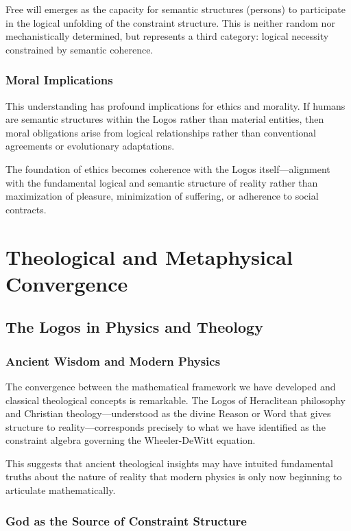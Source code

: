 \documentclass[12pt,a4paper]{article}
\begin{document}
Free will emerges as the capacity for semantic structures (persons) to participate in the logical unfolding of the constraint structure. This is neither random nor mechanistically determined, but represents a third category: logical necessity constrained by semantic coherence.

\subsubsection{Moral Implications}

This understanding has profound implications for ethics and morality. If humans are semantic structures within the Logos rather than material entities, then moral obligations arise from logical relationships rather than conventional agreements or evolutionary adaptations.

The foundation of ethics becomes coherence with the Logos itself—alignment with the fundamental logical and semantic structure of reality rather than maximization of pleasure, minimization of suffering, or adherence to social contracts.

\section{Theological and Metaphysical Convergence}

\subsection{The Logos in Physics and Theology}

\subsubsection{Ancient Wisdom and Modern Physics}

The convergence between the mathematical framework we have developed and classical theological concepts is remarkable. The Logos of Heraclitean philosophy and Christian theology—understood as the divine Reason or Word that gives structure to reality—corresponds precisely to what we have identified as the constraint algebra governing the Wheeler-DeWitt equation.

This suggests that ancient theological insights may have intuited fundamental truths about the nature of reality that modern physics is only now beginning to articulate mathematically.

\subsubsection{God as the Source of Constraint Structure}
\end{document}
